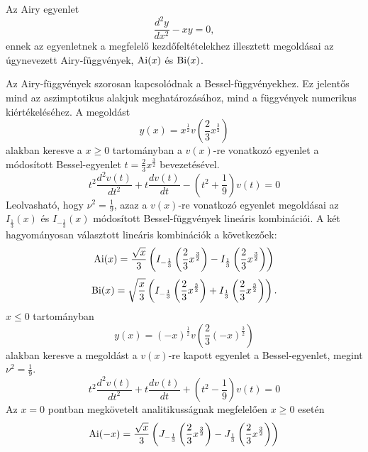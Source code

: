 Az Airy egyenlet
\begin{equation}
	\frac{d^2y}{dx^2} - xy = 0,
	\label{airy:airyeq}
\end{equation}
ennek az egyenletnek a megfelelő kezdőfeltételekhez illesztett megoldásai az úgynevezett Airy-függvények, $\operatorname{Ai}(x)$ és $\operatorname{Bi}(x)$.

Az Airy-függvények szorosan kapcsolódnak a Bessel-függvényekhez. Ez jelentős mind az aszimptotikus alakjuk meghatározásához, mind a függvények numerikus kiértékeléséhez. A megoldást
\begin{equation}
	y(x) = x^{\frac{1}{2}}v\left(\frac{2}{3}x^{\frac{3}{2}}\right)
\end{equation}
alakban keresve a $x \geq 0$ tartományban a $v(x)$-re vonatkozó egyenlet a módosított Bessel-egyenlet $t=\frac{2}{3}x^{\frac{3}{2}}$ bevezetésével.
\begin{equation}
	t^2\frac{d^2v(t)}{dt^2} + t\frac{dv(t)}{dt} - \left(t^2 + \frac{1}{9}\right)v(t) = 0
\end{equation}
Leolvasható, hogy $\nu^2 = \frac{1}{9}$, azaz a $v(x)$-re vonatkozó egyenlet megoldásai az $I_{\frac{1}{3}}(x)$ és $I_{-\frac{1}{3}}(x)$ módosított Bessel-függvények lineáris kombinációi.
A két hagyományosan választott lineáris kombinációk a következőek:
\begin{equation}
	\operatorname{Ai}(x) = \frac{\sqrt{x}}{3}\left(I_{-\frac{1}{3}}\left(\frac{2}{3}x^{\frac{3}{2}}\right)-I_{\frac{1}{3}}\left(\frac{2}{3}x^{\frac{3}{2}}\right)\right)
	\label{airy:ai+}
\end{equation}
\begin{equation}
	\operatorname{Bi}(x) = \sqrt{\frac{x}{3}}\left(I_{-\frac{1}{3}}\left(\frac{2}{3}x^{\frac{3}{2}}\right)+I_{\frac{1}{3}}\left(\frac{2}{3}x^{\frac{3}{2}}\right)\right).
	\label{airy:ai+}
\end{equation}
$x \leq 0$ tartományban
\begin{equation}
	y(x) = (-x)^{\frac{1}{2}}v\left(\frac{2}{3}(-x)^{\frac{3}{2}}\right)
\end{equation}
alakban keresve a megoldást a $v(x)$-re kapott egyenlet a Bessel-egyenlet, megint $\nu^2 = \frac{1}{9}$.
\begin{equation}
	t^2\frac{d^2v(t)}{dt^2} + t\frac{dv(t)}{dt} + \left(t^2 - \frac{1}{9}\right)v(t) = 0
\end{equation}
Az $x=0$ pontban megkövetelt analitikusságnak megfelelően $x \geq 0$ esetén
\begin{equation}
	\operatorname{Ai}(-x) = \frac{\sqrt{x}}{3}\left(J_{-\frac{1}{3}}\left(\frac{2}{3}x^{\frac{3}{2}}\right)-J_{\frac{1}{3}}\left(\frac{2}{3}x^{\frac{3}{2}}\right)\right)
	\label{airy:ai-}
\end{equation}
